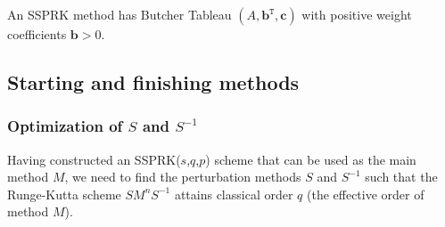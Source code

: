 \begin{lem}\label{lem:ssp_pos_coef}\cite{Ruuth2002}
  An SSPRK method
  has Butcher Tableau \( (A,\textbf{b}^{\texttt{T}},\textbf{c}) \) with positive weight coefficients \( \textbf{b} > 0 \).
\end{lem}



\subsection{Starting and finishing methods}\label{subsection3.2}


\subsubsection{Optimization of $ S $ and $ S^{-1} $}\label{subsection3.2.1}

Having constructed an SSPRK(\( s \),\( q \),\( p \)) scheme that can
be used as the main method \( M \), we need to find the perturbation
methods \( S \) and \( S^{-1} \) such that the Runge-Kutta scheme \(
SM^{n}S^{-1} \) attains classical order $q$ (the effective order of
method \( M \)).

